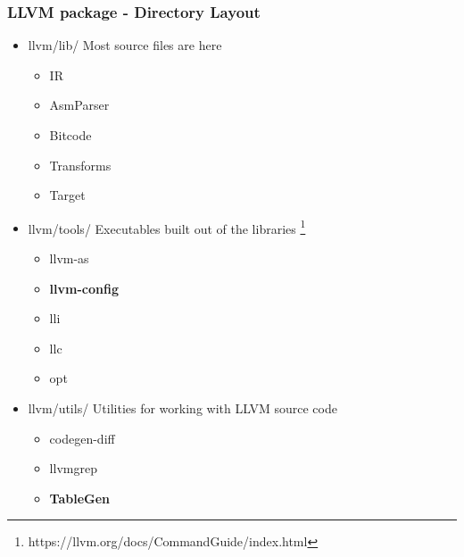 \documentclass{beamer}
\begin{document}
\begin{frame}
\frametitle{LLVM package - Directory Layout}
\begin{itemize}
  \item llvm/lib/ Most source files are here
  \begin{itemize}
    \item IR
    \item AsmParser
    \item Bitcode
    \item Transforms
    \item Target
  \end{itemize}
  \item llvm/tools/ Executables built out of the libraries \footnote{https://llvm.org/docs/CommandGuide/index.html}
  \begin{itemize}
    \item llvm-as
    \item \textbf{llvm-config}
    \item lli
    \item llc
    \item opt
  \end{itemize}
  \item llvm/utils/ Utilities for working with LLVM source code
  \begin{itemize}
    \item codegen-diff
    \item llvmgrep
    \item \textbf{TableGen}
  \end{itemize}
\end{itemize}
\end{frame}
\end{document}
